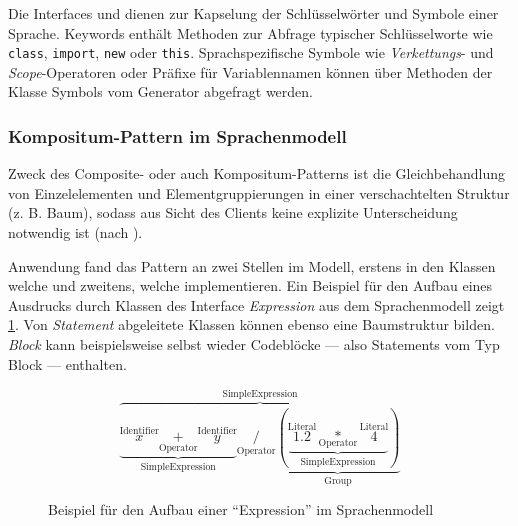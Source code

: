 Die Interfaces  und  dienen zur Kapselung der Schlüsselwörter und Symbole einer Sprache. Keywords enthält Methoden zur Abfrage typischer Schlüsselworte wie \texttt{class}, \texttt{import}, \texttt{new} oder \texttt{this}. Sprachspezifische Symbole wie \emph{Verkettungs}- und \emph{Scope}-Operatoren oder Präfixe für Variablennamen können über Methoden der Klasse Symbols vom Generator abgefragt werden.

\subsubsection{Kompositum-Pattern im Sprachenmodell}
\label{sec:composite_pattern}

Zweck des Composite- oder auch Kompositum-Patterns ist die Gleichbehandlung von Einzelelementen und Elementgruppierungen in einer verschachtelten Struktur
(z. B. Baum), sodass aus Sicht des Clients keine explizite Unterscheidung
notwendig ist (nach \cite[][S. 102]{patternsKompakt}).

Anwendung fand das Pattern an zwei Stellen im Modell, erstens in den Klassen welche  und zweitens, welche  implementieren.
Ein Beispiel für den Aufbau eines Ausdrucks durch Klassen des Interface \emph{Expression} aus dem Sprachenmodell zeigt \cref{fig:example_expression}. Von \emph{Statement} abgeleitete Klassen können ebenso eine Baumstruktur bilden. \emph{Block} kann beispielsweise selbst wieder Codeblöcke --- also Statements vom Typ Block --- enthalten. 

\begin{figure}
    \[
        \overbrace{
            \underbrace{
                \overset{\text{Identifier}}{x} \underset{\text{Operator}}{+} \overset{\text{Identifier}}{y}
            }_{\text{SimpleExpression}} 
            \underset{\text{Operator}}{/}
            \underbrace{
                ( 
                    \underbrace{
                        \overset{\text{Literal}}{1.2} \underset{\text{Operator}}{*} \overset{\text{Literal}}{4}
                    }_{\text{SimpleExpression}} 
                )
            }_{\text{Group}}
        }^{\text{SimpleExpression}} 
    \]   
    \caption{Beispiel für den Aufbau einer \enquote{Expression} im Sprachenmodell}
    \label{fig:example_expression}
\end{figure}
